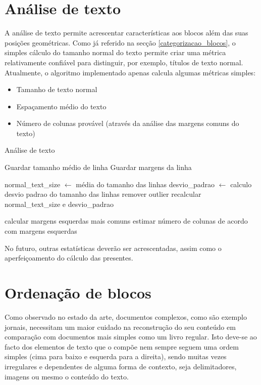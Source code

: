 \section{Análise de texto}
\label{analise_texto}

A análise de texto permite acrescentar características aos blocos além das suas posições geométricas. Como já referido na secção \ref{categorizacao_blocos}, o simples cálculo do tamanho normal do texto permite criar uma métrica relativamente confiável para distinguir, por exemplo, títulos de texto normal. Atualmente, o algoritmo implementado apenas calcula algumas métricas simples:
\begin{itemize}
    \item Tamanho de texto normal
    \item Espaçamento médio do texto
    \item Número de colunas provável (através da análise das margens comuns do texto)
\end{itemize}

\begin{algorithm}[H]
    \caption{Análise de texto}
    \begin{algorithmic}[1]

        \STATE Guardar tamanho médio de linha
        \STATE Guardar margens da linha
    \ENDFOR

    \STATE normal\_text\_size $\gets$ média do tamanho das linhas
    \STATE desvio\_padrao $\gets$ calculo desvio padrao do tamanho das linhas
        \STATE remover outlier
        \STATE recalcular normal\_text\_size e desvio\_padrao
    \ENDWHILE

    \STATE calcular margens esquerdas mais comuns
    \STATE estimar número de colunas de acordo com margens esquerdas
    
\end{algorithmic}
\end{algorithm}

No futuro, outras estatísticas deverão ser acrescentadas, assim como o aperfeiçoamento do cálculo das presentes.


\section{Ordenação de blocos}
\label{ordenacao_blocos}

Como observado no estado da arte, documentos complexos, como são exemplo jornais, necessitam um maior cuidado na reconstrução do seu conteúdo em comparação com documentos mais simples como um livro regular. Isto deve-se ao facto dos elementos de texto que o compõe nem sempre seguem uma ordem simples (cima para baixo e esquerda para a direita), sendo muitas vezes irregulares e dependentes de alguma forma de contexto, seja delimitadores, imagens ou mesmo o conteúdo do texto.

